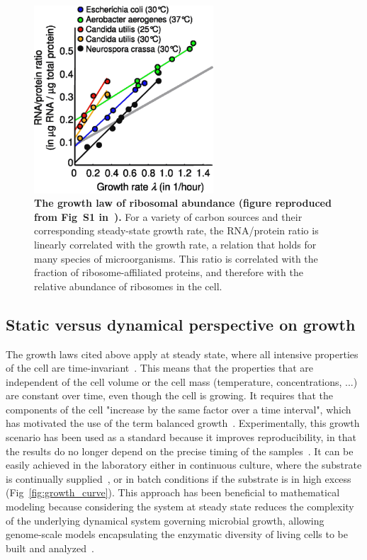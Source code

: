 \begin{figure}[tb]
\centering
\includegraphics[height=7cm]{./Fig/Chapter1/scott_rnaprot}
\caption{
\textbf{The growth law of ribosomal abundance (figure reproduced from Fig~S1 in~\cite{scott_interdependence_2010}).}
For a variety of carbon sources and their corresponding steady-state growth rate, the RNA/protein ratio is linearly correlated with the growth rate, a relation that holds for many species of microorganisms.
This ratio is correlated with the fraction of ribosome-affiliated proteins, and therefore with the relative abundance of ribosomes in the cell.
}
\label{fig:scott_rnaprot}
\end{figure}

\subsection{Static versus dynamical perspective on growth}

The growth laws cited above apply at steady state, where all intensive properties of the cell are time-invariant~\cite{schaechter_microbe_2006,fishov_microbial_1995}.
This means that the properties that are independent of the cell volume or the cell mass (temperature, concentrations, ...) are constant over time, even though the cell is growing.
It requires that the components of the cell "increase by the same factor over a time interval", which has motivated the use of the term balanced growth~\cite{campbell_synchronization_1957}.
Experimentally, this growth scenario has been used as a standard because it improves reproducibility, in that the results do no longer depend on the precise timing of the samples~\cite{schaechter_microbe_2006}.
It can be easily achieved in the laboratory either in continuous culture, where the substrate is continually supplied~\cite{borirak_molecular_2014}, or in batch conditions if the substrate is in high excess (Fig~\ref{fig:growth_curve}).
This approach has been beneficial to mathematical modeling because considering the system at steady state reduces the complexity of the underlying dynamical system governing microbial growth, allowing genome-scale models encapsulating the enzymatic diversity of living cells to be built and analyzed~\cite{orth_what_2010}.

